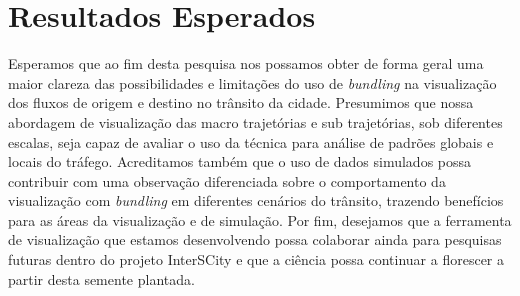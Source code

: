 \section{Resultados Esperados}

  Esperamos que ao fim desta pesquisa nos possamos obter de forma geral uma
maior clareza das possibilidades e limitações do uso de \emph{bundling} na
visualização dos fluxos de origem e destino no trânsito da cidade. Presumimos que
nossa abordagem de visualização das macro trajetórias e sub trajetórias, sob
diferentes escalas, seja capaz de avaliar o uso da técnica para análise de
padrões globais e locais do tráfego. Acreditamos também que o uso de dados
simulados possa contribuir com uma observação diferenciada sobre o
comportamento da visualização com \emph{bundling} em diferentes cenários do
trânsito, trazendo benefícios para as áreas da visualização e de
simulação. Por fim, desejamos que a ferramenta de visualização que
estamos desenvolvendo possa colaborar ainda para pesquisas futuras dentro do
projeto InterSCity e que a ciência possa continuar a florescer a partir desta
semente plantada.
